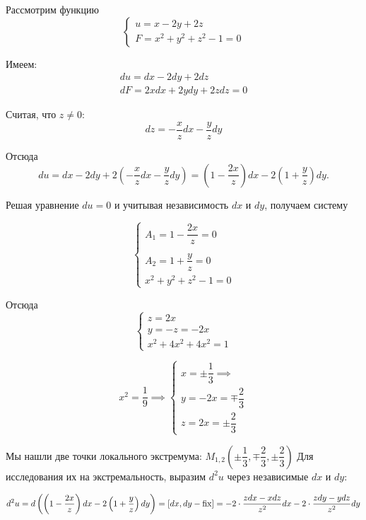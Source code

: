 \documentclass[../../main.tex]{subfiles}
\begin{document}
	\begin{example}
	\;
	
	Рассмотрим функцию 
	\[ \begin{cases}
	u = x - 2y + 2z \\
	F = x^2 + y^2 + z^2 -1 = 0
	\end{cases} \]
	
	Имеем:
	\[\begin{array}{l}
	du = dx - 2dy + 2dz \\
	dF = 2xdx + 2ydy + 2zdz = 0
	\end{array}\]
	
	Считая, что $z \ne 0$:
	\[dz = -\dfrac{x}{z}dx - \dfrac{y}{z}dy\]
	
	Отсюда
	\[du = dx - 2dy + 2\left( -\dfrac{x}{z}dx - 
	\dfrac{y}{z} dy \right) = 
	\left( 1 - \dfrac{2x}{z} \right)dx - 
	2\left( 1 + \dfrac{y}{z} \right)dy.\]
	
	Решая уравнение $du = 0$ и учитывая независимость $dx$ и $dy$,
	получаем систему
	
	\[
	\begin{cases}
	A_1 = 1 - \dfrac{2x}{z} = 0 \\
    \\
	A_2 = 1 + \dfrac{y}{z} = 0 \\
	x^2 + y^2 + z^2 - 1 = 0
	\end{cases} 
	\]
	
	Отсюда
	\[ \begin{cases}
	z = 2x \\
	y = -z = -2x \\
	x^2 + 4x^2 + 4x^2 = 1
	\end{cases} \]
	
	\[x^2 = \dfrac{1}{9} \implies
	 \begin{cases}
        x = \pm \dfrac{1}{3} \implies \\
        y = -2x = \mp \dfrac{2}{3} \\
        z = 2x = \pm \dfrac{2}{3}
	 \end{cases}
	\]
 
	Мы нашли две точки локального экстремума: $M_{1,2} 
	\left( \pm \dfrac{1}{3}, \mp \dfrac{2}{3}, 
	\pm \dfrac{2}{3} \right)$ Для исследования их на 
	экстремальность, выразим $d^2 u$ через
	независимые $dx$ и $dy$:
	
	\[d^2u = d\left( \left(1 - \dfrac{2x}{z}\right)dx - 
	2\left(1 + \dfrac{y}{z}\right)dy\right) = 
	\left[dx, dy - \operatorname{fix}\right] = -2 \cdot 
	\dfrac{zdx - xdz}{z^2}dx - 2 \cdot \dfrac{zdy - ydz}{z^2}dy\]
	

\end{example}
\end{document}
